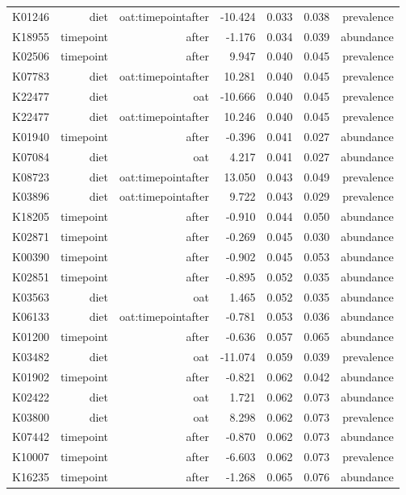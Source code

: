 \documentclass[
]{article}
\begin{document}
\begin{longtable}[t]{lrrrrrr}
K01246 & diet & oat:timepointafter & -10.424 & 0.033 & 0.038 & prevalence\\
\addlinespace
K18955 & timepoint & after & -1.176 & 0.034 & 0.039 & abundance\\
K02506 & timepoint & after & 9.947 & 0.040 & 0.045 & prevalence\\
K07783 & diet & oat:timepointafter & 10.281 & 0.040 & 0.045 & prevalence\\
K22477 & diet & oat & -10.666 & 0.040 & 0.045 & prevalence\\
K22477 & diet & oat:timepointafter & 10.246 & 0.040 & 0.045 & prevalence\\
\addlinespace
K01940 & timepoint & after & -0.396 & 0.041 & 0.027 & abundance\\
K07084 & diet & oat & 4.217 & 0.041 & 0.027 & abundance\\
K08723 & diet & oat:timepointafter & 13.050 & 0.043 & 0.049 & prevalence\\
K03896 & diet & oat:timepointafter & 9.722 & 0.043 & 0.029 & prevalence\\
K18205 & timepoint & after & -0.910 & 0.044 & 0.050 & abundance\\
\addlinespace
K02871 & timepoint & after & -0.269 & 0.045 & 0.030 & abundance\\
K00390 & timepoint & after & -0.902 & 0.045 & 0.053 & abundance\\
K02851 & timepoint & after & -0.895 & 0.052 & 0.035 & abundance\\
K03563 & diet & oat & 1.465 & 0.052 & 0.035 & abundance\\
K06133 & diet & oat:timepointafter & -0.781 & 0.053 & 0.036 & abundance\\
\addlinespace
K01200 & timepoint & after & -0.636 & 0.057 & 0.065 & abundance\\
K03482 & diet & oat & -11.074 & 0.059 & 0.039 & prevalence\\
K01902 & timepoint & after & -0.821 & 0.062 & 0.042 & abundance\\
K02422 & diet & oat & 1.721 & 0.062 & 0.073 & abundance\\
K03800 & diet & oat & 8.298 & 0.062 & 0.073 & prevalence\\
\addlinespace
K07442 & timepoint & after & -0.870 & 0.062 & 0.073 & abundance\\
K10007 & timepoint & after & -6.603 & 0.062 & 0.073 & prevalence\\
K16235 & timepoint & after & -1.268 & 0.065 & 0.076 & abundance\\

\end{longtable}
\end{document}
